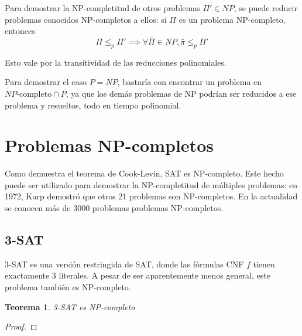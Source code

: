 \documentclass[a4paper]{report}
\newtheorem*{theorem*}{Teorema}
\begin{document}
Para demostrar la NP-completitud de otros problemas $\Pi' \in NP$, se puede reducir problemas conocidos NP-completos a ellos: si $\Pi$ es un problema NP-completo, entonces
$$\Pi \leq_p \Pi' \implies \forall \bar{\Pi} \in NP, \bar{\pi} \leq_p \Pi'$$

Esto vale por la transitividad de las reducciones polinomiales.

Para demostrar el caso $P = NP$, bastaría con encontrar un problema en $NP\text{-completo} \cap P$, ya que los demás problemas de NP podrían ser reducidos a ese problema y resueltos, todo en tiempo polinomial. 

\section{Problemas NP-completos}

Como demuestra el teorema de Cook-Levin, SAT es NP-completo. Este hecho puede ser utilizado para demostrar la NP-completitud de múltiples problemas: en 1972, Karp demostró que otros 21 problemas son NP-completos. En la actualidad se conocen más de 3000 problemas problemas NP-completos.

\subsection{3-SAT}

3-SAT es una versión restringida de SAT, donde las fórmulas CNF $f$ tienen exactamente 3 literales. A pesar de ser aparentemente menos general, este problema también es NP-completo.
\begin{theorem*}
    3-SAT es NP-completo
\end{theorem*}
\begin{proof}
\end{proof}


\label{np-hard}
\end{document}
